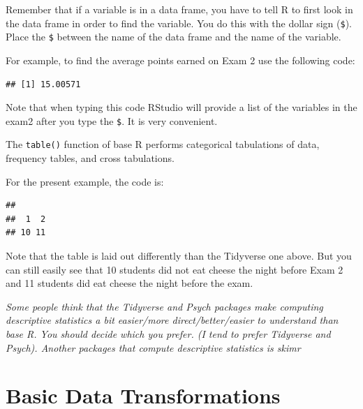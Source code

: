 \documentclass[
]{book}
\newenvironment{Shaded}{\begin{snugshade}}{\end{snugshade}}
\newcommand{\KeywordTok}[1]{\textcolor[rgb]{0.13,0.29,0.53}{\textbf{#1}}}
\newcommand{\NormalTok}[1]{#1}
\newcommand{\OperatorTok}[1]{\textcolor[rgb]{0.81,0.36,0.00}{\textbf{#1}}}
\begin{document}
Remember that if a variable is in a data frame, you have to tell R to first look in the data frame in order to find the variable. You do this with the dollar sign (\texttt{\$}). Place the \texttt{\$} between the name of the data frame and the name of the variable.

For example, to find the average points earned on Exam 2 use the following code:

\begin{Shaded}
\end{Shaded}

\begin{verbatim}
## [1] 15.00571
\end{verbatim}

Note that when typing this code RStudio will provide a list of the variables in the exam2 after you type the \texttt{\$}. It is very convenient.

The \texttt{table()} function of base R performs categorical tabulations of data, frequency tables, and cross tabulations.

For the present example, the code is:

\begin{Shaded}
\end{Shaded}

\begin{verbatim}
## 
##  1  2 
## 10 11
\end{verbatim}

Note that the table is laid out differently than the Tidyverse one above. But you can still easily see that 10 students did not eat cheese the night before Exam 2 and 11 students did eat cheese the night before the exam.

\emph{Some people think that the Tidyverse and Psych packages make computing descriptive statistics a bit easier/more direct/better/easier to understand than base R. You should decide which you prefer. (I tend to prefer Tidyverse and Psych). Another packages that compute descriptive statistics is skimr }

\hypertarget{basic-data-transformations}{%
\chapter{Basic Data Transformations}\label{basic-data-transformations}}
\end{document}
